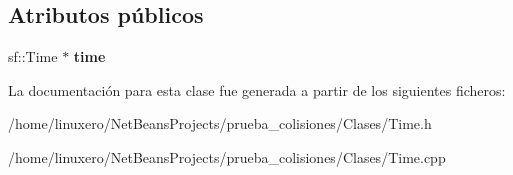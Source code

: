 \subsection*{Atributos públicos}
\begin{DoxyCompactItemize}
\item 
\hypertarget{classTime_a8af45df4ac819cbaa57b2fcdc16722d4}{sf\-::\-Time $\ast$ {\bfseries time}}\label{classTime_a8af45df4ac819cbaa57b2fcdc16722d4}

\end{DoxyCompactItemize}


La documentación para esta clase fue generada a partir de los siguientes ficheros\-:\begin{DoxyCompactItemize}
\item 
/home/linuxero/\-Net\-Beans\-Projects/prueba\-\_\-colisiones/\-Clases/Time.\-h\item 
/home/linuxero/\-Net\-Beans\-Projects/prueba\-\_\-colisiones/\-Clases/Time.\-cpp\end{DoxyCompactItemize}
